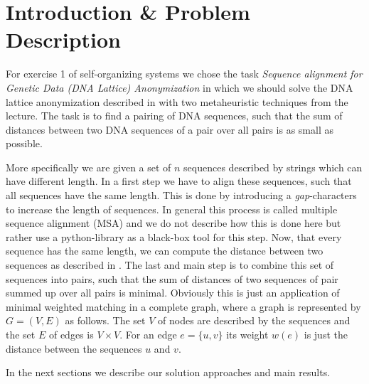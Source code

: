 \documentclass[12pt]{article}
\begin{document}
\maketitle

\section{Introduction \& Problem Description}
For exercise 1 of self-organizing systems we chose the task \textit{Sequence alignment for Genetic Data (DNA Lattice) Anonymization} in which we should solve the DNA lattice anonymization described in \cite{mainpaper} with two metaheuristic techniques from the lecture.
The task is to find a pairing of DNA sequences, such that the sum of distances between two DNA sequences of a pair over all pairs is as small as possible.

More specifically we are given a set of $n$ sequences described by strings which can have different length.
In a first step we have to align these sequences, such that all sequences have the same length.
This is done by introducing a \textit{gap}-characters to increase the length of sequences.
In general this process is called multiple sequence alignment (MSA) and we do not describe how this is done here but rather use a python-library as a black-box tool for this step.
Now, that every sequence has the same length, we can compute the distance between two sequences as described in \cite{mainpaper}.
The last and main step is to combine this set of sequences into pairs, such that the sum of distances of two sequences of pair summed up over all pairs is minimal.
Obviously this is just an application of minimal weighted matching in a complete graph, where a graph is represented by $G=(V,E)$ as follows.
The set $V$ of nodes are described by the sequences and the set $E$ of edges is $V\times V$.
For an edge $e=\{u,v\}$ its weight $w(e)$ is just the distance between the sequences $u$ and $v$.

In the next sections we describe our solution approaches and main results.
\end{document}
